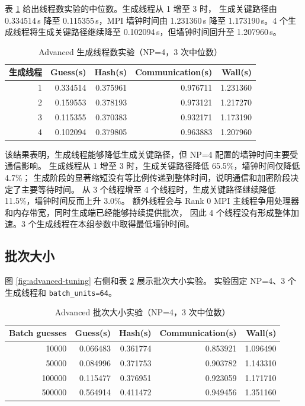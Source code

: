 \documentclass[UTF8,a4paper,12pt]{ctexart}
\newcommand{\code}[1]{\texttt{#1}}
\newcommand{\seconds}[1]{#1\,s}
\begin{document}
表 \ref{tab:threads} 给出线程数实验的中位数。生成线程从 1 增至 3 时，
生成关键路径由 \seconds{0.334514} 降至 \seconds{0.115355}，MPI 墙钟时间由
\seconds{1.231360} 降至 \seconds{1.173190}。4 个生成线程将生成关键路径继续降至
\seconds{0.102094}，但墙钟时间回升至 \seconds{1.207960}。

\begin{table}[H]
  \centering
  \caption{Advanced 生成线程数实验（NP=4，3 次中位数）}
  \label{tab:threads}
  \begin{tabular}{rrrrr}
    \toprule
    生成线程 & Guess(s) & Hash(s) & Communication(s) & Wall(s) \\
    \midrule
    1 & 0.334514 & 0.375961 & 0.976711 & 1.231360 \\
    2 & 0.159553 & 0.378193 & 0.973121 & 1.217270 \\
    3 & 0.115355 & 0.370383 & 0.932171 & 1.173190 \\
    4 & 0.102094 & 0.379805 & 0.963883 & 1.207960 \\
    \bottomrule
  \end{tabular}
\end{table}

该结果表明，生成线程能够降低生成关键路径，但 NP=4 配置的墙钟时间主要受通信影响。
生成线程从 1 增至 3 时，生成关键路径降低 65.5\%，墙钟时间仅降低 4.7\%；
生成阶段的显著缩短没有等比例传递到整体时间，说明通信和加密阶段决定了主要等待时间。
从 3 个线程增至 4 个线程时，生成关键路径继续降低 11.5\%，墙钟时间反而上升 3.0\%。
额外线程会与 Rank 0 MPI 主线程争用处理器和内存带宽，同时生成端已经能够持续提供批次，
因此 4 个线程没有形成整体加速。3 个生成线程在本组参数中取得最低墙钟时间。

\subsection{批次大小}

图 \ref{fig:advanced-tuning} 右侧和表 \ref{tab:batch} 展示批次大小实验。
实验固定 NP=4、3 个生成线程和 \code{batch\_units=64}。

\begin{table}[H]
  \centering
  \caption{Advanced 批次大小实验（NP=4，3 次中位数）}
  \label{tab:batch}
  \begin{tabular}{rrrrr}
    \toprule
    Batch guesses & Guess(s) & Hash(s) & Communication(s) & Wall(s) \\
    \midrule
    10000  & 0.066483 & 0.361774 & 0.853921 & 1.096490 \\
    50000  & 0.084996 & 0.371753 & 0.903782 & 1.143310 \\
    100000 & 0.115477 & 0.376951 & 0.923059 & 1.171710 \\
    500000 & 0.564914 & 0.411472 & 0.949456 & 1.351160 \\
    \bottomrule
  \end{tabular}
\end{table}
\end{document}
